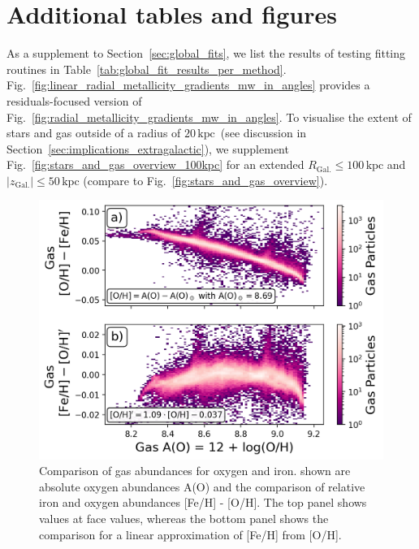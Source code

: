 \documentclass[fleqn,usenatbib]{mnras}
\newcommand{\nihaoRmax}{$20\,\mathrm{kpc}$}
\begin{document}




\appendix

\section{Additional tables and figures} \label{sec:appendix_different_fits}

As a supplement to Section~\ref{sec:global_fits}, we list the results of testing fitting routines in Table~\ref{tab:global_fit_results_per_method}. Fig.~\ref{fig:linear_radial_metallicity_gradients_mw_in_angles} provides a residuals-focused version of Fig.~\ref{fig:radial_metallicity_gradients_mw_in_angles}. To visualise the extent of stars and gas outside of a radius of \nihaoRmax\ (see discussion in Section~\ref{sec:implications_extragalactic}), we supplement Fig.~\ref{fig:stars_and_gas_overview_100kpc} for an extended $R_\mathrm{Gal.} \leq 100\,\mathrm{kpc}$ and $\vert z_\mathrm{Gal.} \vert \leq 50\,\mathrm{kpc}$ (compare to Fig.~\ref{fig:stars_and_gas_overview}). 



\begin{figure}
    \centering
    \includegraphics[width=\columnwidth]{figures/fe_h_vs_a_o_gas}
    \caption{Comparison of gas abundances for oxygen and iron. shown are absolute oxygen abundances A(O) and the comparison of relative iron and oxygen abundances [Fe/H] - [O/H]. The top panel shows values at face values, whereas the bottom panel shows the comparison for a linear approximation of [Fe/H] from [O/H].}    \label{fig:fe_h_vs_a_o_gas}
\end{figure}
\end{document}
